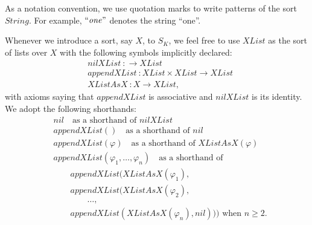 \documentclass[UTF8]{article}
\theoremstyle{plain}
\theoremstyle{definition}
\theoremstyle{remark}
\begin{document}
As a notation convention, we use quotation marks to write patterns of the sort $\mathit{String}$. For example, $\mathit{``one"}$ denotes the string ``one''.

Whenever we introduce a sort, say $\mathit{X}$, to $S_K$, we feel free to 
use $\mathit{XList}$ as the sort of lists over $\mathit{X}$ 
with the following symbols implicitly declared:
\begin{align*}
&\mathit{nilXList} \ \colon \to \mathit{XList} \\
&\mathit{appendXList} \ \colon \mathit{XList} \times \mathit{XList} \to 
  \mathit{XList}\\
&\mathit{XListAsX} \ \colon \mathit{X} \to \mathit{XList},
\end{align*}
with axioms saying that $\mathit{appendXList}$ is associative and $\mathit{nilXList}$ is its identity.
We adopt the following shorthands:
\begin{align*}
&\mathit{nil}  \quad \text{as a shorthand of $\mathit{nilXList}$} \\
&\mathit{appendXList}()  \quad \text{as a shorthand of $\mathit{nil}$} \\
&\mathit{appendXList}(\varphi) \quad \text{as a shorthand of $\mathit{XListAsX}(\varphi)$}\\
&\mathit{appendXList}(\varphi_1,\dots,\varphi_n) \quad \text{as a shorthand of}\\ 
&\qquad \mathit{appendXList}(\mathit{XListAsX}(\varphi_1),\\
&\qquad \mathit{appendXList}(\mathit{XListAsX}(\varphi_2), \\
&\qquad \qquad \dots,\\
&\qquad \mathit{appendXList}(\mathit{XListAsX}(\varphi_n), \mathit{nil})))
\text{ when $n\ge 2$.}
\end{align*}
\end{document}
